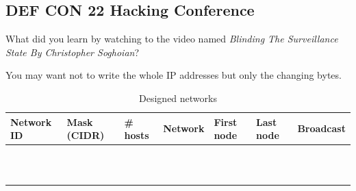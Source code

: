 \documentclass[11pt]{article}
\begin{document}
	\subsection{DEF CON 22 Hacking Conference}
		What did you learn by watching to the video named \emph{Blinding The Surveillance State By Christopher Soghoian}?
\pagebreak

You may want not to write the whole IP addresses but only the changing bytes.
\renewcommand{\arraystretch}{1.5}
\setlength{\tabcolsep}{14pt}
	\begin{table}[h]
	  \centering
		  \begin{tabular}{|l|l|l|l|l|l|l|}
			  \hline
				Network ID	&	Mask (CIDR)	& \# hosts	& Network	&	First node	&	Last node	&	Broadcast	\\ \hline
				&&&&&&	\\ \hline
				&&&&&&	\\ \hline
				&&&&&&	\\ \hline
				&&&&&&	\\ \hline
				&&&&&&	\\ \hline
				&&&&&&	\\ \hline
				&&&&&&	\\ \hline
				&&&&&&	\\ \hline
				&&&&&&	\\ \hline
				&&&&&&	\\ \hline
				&&&&&&	\\ \hline
		  \end{tabular}
		  \caption{Designed networks}
	  \label{tab:design}
	\end{table}
\renewcommand{\arraystretch}{1.0}
\end{document}
